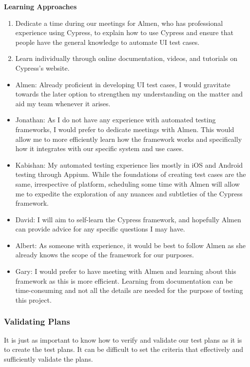 \documentclass[12pt, titlepage]{article}
\begin{document}
\noindent \textbf{Learning Approaches}
\begin{enumerate}
    \item Dedicate a time during our meetings for Almen, who has professional
    experience using Cypress, to explain how to use Cypress and ensure that
    people have the general knowledge to automate UI test cases.
    \item Learn individually through online documentation, videos, and tutorials
    on Cypress's website.
\end{enumerate}

\begin{itemize}
    \item Almen: Already proficient in developing UI test cases, I would
    gravitate towards the later option to strengthen my understanding on the
    matter and aid my team whenever it arises.
    \item Jonathan: As I do not have any experience with automated testing
    frameworks, I would prefer to dedicate meetings with Almen. This would allow
    me to more efficiently learn how the framework works and specifically how it
    integrates with our specific system and use cases.
    \item Kabishan: My automated testing experience lies mostly in iOS and
    Android testing through Appium. While the foundations of creating test cases
    are the same, irrespective of platform, scheduling some time with Almen will
    allow me to expedite the exploration of any nuances and subtleties of the
    Cypress framework.
    \item David: I will aim to self-learn the Cypress framework, and hopefully
    Almen can provide advice for any specific questions I may have.
    \item Albert: As someone with experience, it would be best to follow Almen
    as she already knows the scope of the framework for our purposes.
    \item Gary: I would prefer to have meeting with Almen and learning about
    this framework as this is more efficient. Learning from documentation can be
    time-consuming and not all the details are needed for the purpose of testing
    this project.
\end{itemize}

\subsubsection{Validating Plans}
It is just as important to know how to verify and validate our test plans as it
is to create the test plans. It can be difficult to set the criteria that
effectively and sufficiently validate the plans. \\
\end{document}
